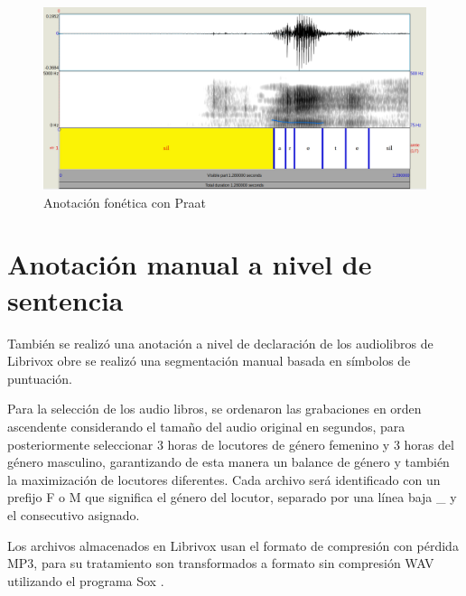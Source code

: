

\begin{figure}[H]
\caption{Anotación fonética con Praat}
\label{img:anotacion_fonetica_praat}
\includegraphics[width=\textwidth]{imagenes/03_01_anotacion_fonetica.png}
\end{figure}





\section{Anotación manual a nivel de sentencia}

También se realizó una anotación a nivel de declaración de los audiolibros de Librivox obre  se realizó una segmentación manual basada en símbolos de puntuación. 

Para la selección de los audio libros, se ordenaron las grabaciones en orden ascendente considerando el tamaño del audio original en segundos, para posteriormente seleccionar 3 horas de locutores de género femenino y 3 horas del género masculino, garantizando de esta manera un balance de género y también la maximización de locutores diferentes. Cada archivo será identificado con un prefijo F o M que significa el género del locutor, separado por una línea baja \_ y el consecutivo asignado.

Los archivos almacenados en Librivox usan el formato de compresión con pérdida MP3, para su tratamiento son transformados a formato sin compresión WAV utilizando el programa Sox \cite{Sox}.


